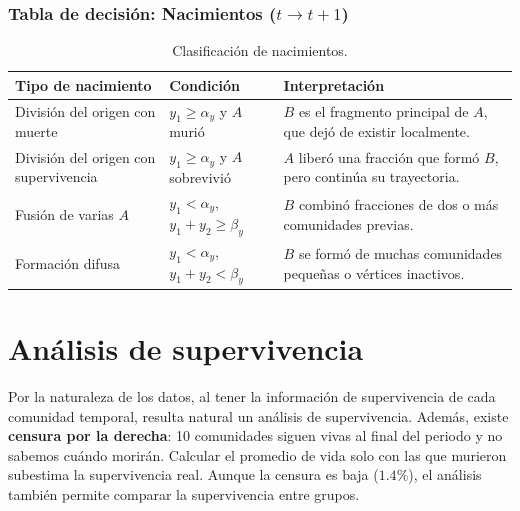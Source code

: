 \documentclass[12pt]{article}
\begin{document}
\subsubsection*{Tabla de decisión: Nacimientos ($t \to t+1$)}
\begin{table}[H]
\centering
\caption{Clasificación de nacimientos.}
\begin{tabular}{@{}p{} p{} p{}@{}}
\toprule
\textbf{Tipo de nacimiento} & \textbf{Condición} & \textbf{Interpretación} \\
\midrule
División del origen con muerte & $y_1 \geq \alpha_y$ y $A$ murió & $B$ es el fragmento principal de $A$, que dejó de existir localmente. \\
\addlinespace
División del origen con supervivencia & $y_1 \geq \alpha_y$ y $A$ sobrevivió & $A$ liberó una fracción que formó $B$, pero continúa su trayectoria. \\
\addlinespace
Fusión de varias $A$ & $y_1 < \alpha_y$, $y_1 + y_2 \geq \beta_y$ & $B$ combinó fracciones de dos o más comunidades previas. \\
\addlinespace
Formación difusa & $y_1 < \alpha_y$, $y_1+y_2 < \beta_y$ & $B$ se formó de muchas comunidades pequeñas o vértices inactivos. \\
\bottomrule
\end{tabular}
\end{table}

\section{Análisis de supervivencia}
\label{sec:supervivencia}

Por la naturaleza de los datos, al tener la información de supervivencia de cada comunidad temporal, resulta natural un análisis de supervivencia. Además, existe \textbf{censura por la derecha}: 10 comunidades siguen vivas al final del periodo y no sabemos cuándo morirán. Calcular el promedio de vida solo con las que murieron subestima la supervivencia real. Aunque la censura es baja ($1.4\%$), el análisis también permite comparar la supervivencia entre grupos.
\end{document}
